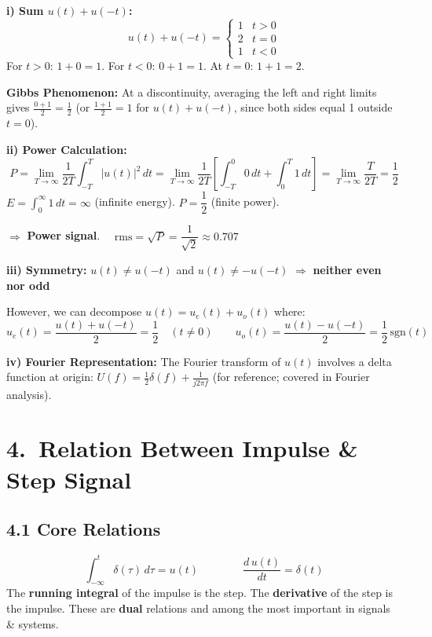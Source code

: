 \documentclass[10pt,a4paper]{article}
\begin{document}
\begin{propbox}
\textbf{i) Sum $u(t) + u(-t)$:}
\[
u(t) + u(-t) = \begin{cases}1 & t > 0\\ 2 & t = 0\\ 1 & t < 0\end{cases}
\]
For $t>0$: $1+0=1$. For $t<0$: $0+1=1$. At $t=0$: $1+1=2$.

\textbf{Gibbs Phenomenon:} At a discontinuity, averaging the left and right limits gives $\tfrac{0+1}{2}=\tfrac{1}{2}$ (or $\tfrac{1+1}{2}=1$ for $u(t)+u(-t)$, since both sides equal 1 outside $t=0$).

\smallskip
\textbf{ii) Power Calculation:}
\[
P = \lim_{T\to\infty}\frac{1}{2T}\int_{-T}^{T}|u(t)|^2\,dt
= \lim_{T\to\infty}\frac{1}{2T}\left[\int_{-T}^{0}0\,dt+\int_{0}^{T}1\,dt\right]
= \lim_{T\to\infty}\frac{T}{2T} = \frac{1}{2}
\]
$E = \displaystyle\int_0^\infty 1\,dt = \infty$ (infinite energy). $P = \dfrac{1}{2}$ (finite power).

$\Rightarrow$ \textbf{Power signal}. $\quad \text{rms} = \sqrt{P} = \dfrac{1}{\sqrt{2}} \approx 0.707$

\smallskip
\textbf{iii) Symmetry:} $u(t) \neq u(-t)$ and $u(t) \neq -u(-t)$ $\Rightarrow$ \textbf{neither even nor odd}

However, we can decompose $u(t) = u_e(t) + u_o(t)$ where:
\[
u_e(t) = \frac{u(t)+u(-t)}{2} = \frac{1}{2}\quad(t\neq0) \qquad u_o(t) = \frac{u(t)-u(-t)}{2} = \frac{1}{2}\,\text{sgn}(t)
\]

\smallskip
\textbf{iv) Fourier Representation:} The Fourier transform of $u(t)$ involves a delta function at origin:
$U(f) = \frac{1}{2}\delta(f) + \frac{1}{j2\pi f}$ (for reference; covered in Fourier analysis).
\end{propbox}

\section{4.\ Relation Between Impulse \& Step Signal}

\subsection*{4.1 Core Relations}

\begin{defbox}
\[
\boxed{\int_{-\infty}^{t}\delta(\tau)\,d\tau = u(t)} \qquad\qquad \boxed{\frac{d\,u(t)}{dt} = \delta(t)}
\]
The \textbf{running integral} of the impulse is the step. The \textbf{derivative} of the step is the impulse.
These are \textbf{dual} relations and among the most important in signals \& systems.
\end{defbox}
\end{document}
